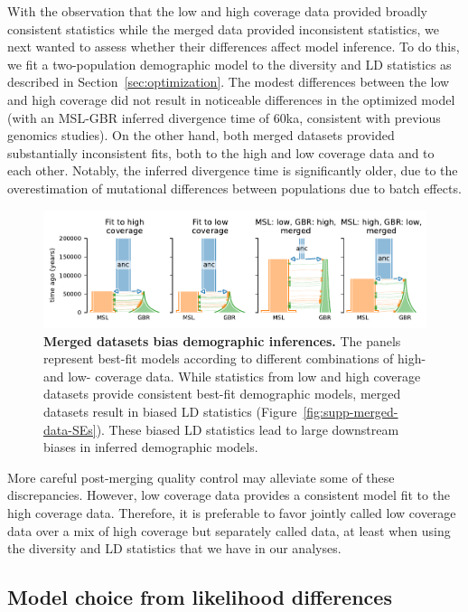 \documentclass[]{article}
\begin{document}
With the observation that the low and high coverage data provided broadly
consistent statistics while the merged data provided inconsistent statistics,
we next wanted to assess whether their differences affect model inference. To
do this, we fit a two-population demographic model to the diversity and LD
statistics as described in Section~\ref{sec:optimization}. The modest
differences between the low and high coverage did not result in noticeable
differences in the optimized model (with an MSL-GBR inferred divergence time of
60ka, consistent with previous genomics studies). On the other hand, both
merged datasets provided substantially inconsistent fits, both to the high and
low coverage data and to each other. Notably, the inferred divergence time is
significantly older, due to the overestimation of mutational differences
between populations due to batch effects.

\begin{figure}[ht!]
    \centering
    \includegraphics{figures/supp-merged-data-model-fits}
    \caption{
        \textbf{Merged datasets bias demographic inferences.}
        The panels represent best-fit models according to 
        different combinations of high- and low- coverage data.
        While statistics from low and high coverage datasets provide consistent
        best-fit demographic models, merged datasets result in biased LD
        statistics (Figure~\ref{fig:supp-merged-data-SEs}). These biased LD
        statistics lead to large downstream biases in inferred demographic
        models. 
    }
    \label{fig:supp-merged-data-fits}
\end{figure}

More careful post-merging quality control may alleviate some of these
discrepancies. However, low coverage data provides a consistent model fit to
the high coverage data. Therefore, it is preferable to favor jointly called low
coverage data over a mix of high coverage but separately called data, at least
when using the diversity and LD statistics that we have in our analyses.

\subsection{Model choice from likelihood differences}
\label{sec:refit-simulated-data}
\end{document}

